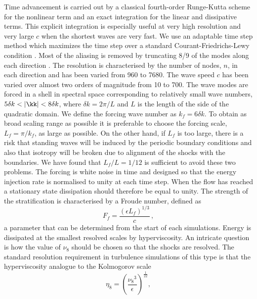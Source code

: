 %
Time advancement is carried out by a classical fourth-order Runge-Kutta scheme
for the nonlinear term and an exact integration for the linear and dissipative
terms. This explicit integration is especially useful at very high resolution
and very large $c$ when the shortest waves are very fast. We use an adaptable
time step method which maximizes the time step over a standard
Courant-Friedrichs-Lewy condition \cite{Lundbladh1999, AugierChomazBillant2012}.
%
Most of the aliasing is removed by truncating 8/9 of the modes along each
direction \cite[for a detail discussion on the issues of the non-conservation
of the non-quadratic energy and the aliasing errors in the truncated one-layer
shallow water model, see][]{FargeSadourny1989}. The resolution is characterised
by the number of nodes, $n$, in each direction and has been varied from 960
to 7680.
%
The wave speed $c$ has been varied over almost two orders of magnitude from 10
to 700. The wave modes are forced in a shell in spectral space corresponding to
relatively small wave numbers, $ 5 \delta k < |\kk| < 8 \delta k$, where $
\delta k = 2 \pi /L $ and $ L $ is the length of the side of the quadratic
domain.  We define the forcing wave number as $ k_f = 6 \delta k $. To obtain as broad scaling range as possible it is preferable to choose 
the forcing scale, $ L_f = \pi/k_f $, as large as possible. On the other hand, if $ L_f $ is too large, there is a risk that standing waves will be induced by the periodic boundary conditions and also that isotropy will be broken due to alignment of the shocks with the boundaries. 
We have found that $ L_f/L =1/12 $ is sufficient to avoid these two problems. 
The forcing is white noise in time and designed so that the energy
injection rate is normalised to unity at each time step. When the flow has reached a stationary state dissipation should therefore be equal to unity. 
The strength of the stratification is characterised by a
Froude number, defined as
\begin{equation} \label{Fr}
F_f = \frac{(\epsilon L_f)^{1/3}}{c} \, ,
\end{equation}
a parameter that can be determined from the start of each simulations.
Energy is dissipated at the smallest resolved scales by hyperviscosity. An intricate question is how the value of $ \nu_{8} $ should be chosen so that the shocks are resolved. The standard resolution requirement in turbulence simulations of this type is that the hyperviscosity analogue to the Kolmogorov scale
\begin{equation}  \label{KolmEight}
\eta_{8} = \left( \frac{{\nu_8}^3}{\epsilon} \right)^{\frac{1}{22}},
\end{equation}
